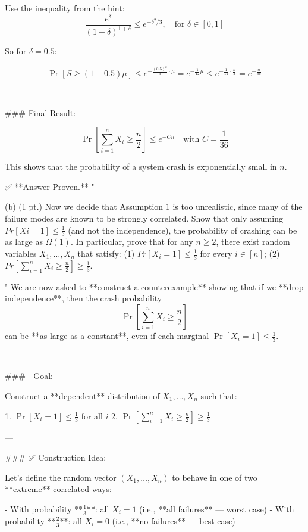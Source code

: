 Use the inequality from the hint:
\[
\frac{e^{\delta}}{(1 + \delta)^{1 + \delta}} \le e^{-\delta^2 / 3}, \quad \text{for } \delta \in [0,1]
\]

So for \( \delta = 0.5 \):

\[
\Pr[S \ge (1 + 0.5)\mu] \le e^{ -\frac{(0.5)^2}{3} \cdot \mu } = e^{ -\frac{1}{12} \mu } \le e^{- \frac{1}{12} \cdot \frac{n}{3}} = e^{ -\frac{n}{36} }
\]

---

### Final Result:

\[
\Pr\left[ \sum_{i=1}^n X_i \ge \frac{n}{2} \right] \le e^{-Cn}
\quad \text{with } C = \frac{1}{36}
\]

This shows that the probability of a system crash is exponentially small in \( n \).

✅ **Answer Proven.**
"

(b) (1 pt.) Now we decide that Assumption $1$ is too unrealistic, since many of the failure modes are known to be strongly correlated. Show that only assuming $Pr[Xi = 1] \le \frac{1}{3}$ (and not the independence), the probability of crashing can be as large as $\Omega(1)$. In particular, prove that for any $n \ge 2$, there exist random variables $X_1, \dots, X_n$ that satisfy: (1) $Pr[X_i = 1] \le \frac{1}{3}$ for every $i \in [n]$; (2) $Pr [\sum_{i=1}^n X_i \ge \frac{n}{2}] \ge \frac{1}{3}$.

"
We are now asked to **construct a counterexample** showing that if we **drop independence**, then the crash probability  
\[
\Pr\left[\sum_{i=1}^n X_i \ge \frac{n}{2} \right]
\]
can be **as large as a constant**, even if each marginal \( \Pr[X_i = 1] \le \frac{1}{3} \).

---

### 🚩 Goal:

Construct a **dependent** distribution of \( X_1, \dots, X_n \) such that:

1. \( \Pr[X_i = 1] \le \frac{1}{3} \) for all \( i \)
2. \( \Pr\left[\sum_{i=1}^n X_i \ge \frac{n}{2} \right] \ge \frac{1}{3} \)

---

### ✅ Construction Idea:

Let's define the random vector \( (X_1, \dots, X_n) \) to behave in one of two **extreme** correlated ways:

- With probability **\( \frac{1}{3} \)**: all \( X_i = 1 \) (i.e., **all failures** — worst case)
- With probability **\( \frac{2}{3} \)**: all \( X_i = 0 \) (i.e., **no failures** — best case)

